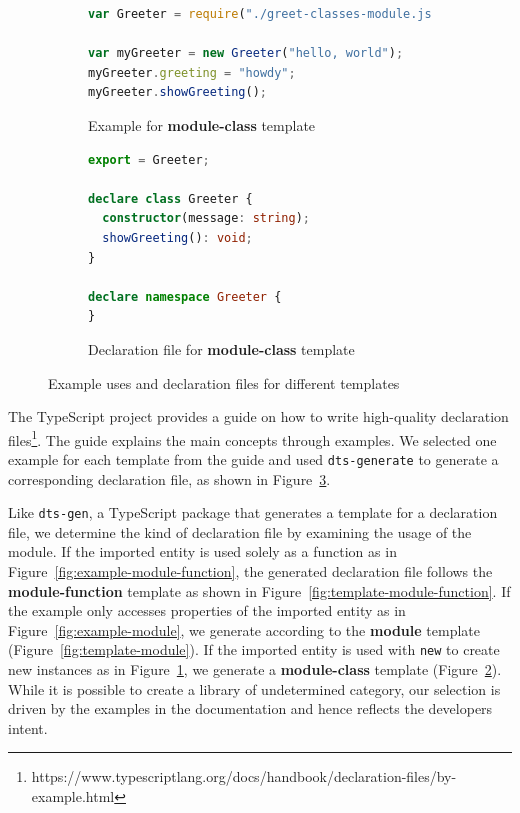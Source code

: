 \documentclass[english,cleveref,autoref,submission]{programming}
\newcommand{\figref}[1]{Figure~\ref{#1}}
\begin{document}
\begin{figure}[tp]
    \begin{subfigure}{0.48\linewidth}
      \begin{lstlisting}[language=JavaScript,numbers=none]
var Greeter = require("./greet-classes-module.js");

var myGreeter = new Greeter("hello, world");
myGreeter.greeting = "howdy";
myGreeter.showGreeting();
      \end{lstlisting}
      \caption{Example for \textbf{module-class} template}
      \label{fig:example-class}
    \end{subfigure}
    \hfill
    \begin{subfigure}{0.48\linewidth}
      \begin{lstlisting}[language=TypeScript,numbers=none]
export = Greeter;

declare class Greeter {
  constructor(message: string);
  showGreeting(): void;
}

declare namespace Greeter {
}
      \end{lstlisting}
      \caption{Declaration file for \textbf{module-class} template}
      \label{fig:template-class}
    \end{subfigure}

  \caption{Example uses and declaration files for different templates}
  \label{fig:typescript-templates-by-example}
\end{figure}
 
The TypeScript project provides a guide on how to write high-quality declaration
files\footnote{https://www.typescriptlang.org/docs/handbook/declaration-files/by-example.html}. The guide
explains the main concepts through examples. We selected one example for each template
from the guide and
used \texttt{dts-generate} to generate a corresponding declaration file, as shown in
\figref{fig:typescript-templates-by-example}.

Like \texttt{dts-gen}, a TypeScript package that generates a template for a declaration
file, we determine the kind of declaration file by examining the usage
of the module. If the
imported entity is used solely as a function as in Figure~\ref{fig:example-module-function}, the
generated declaration file follows the \textbf{module-function} template as shown in Figure~\ref{fig:template-module-function}.
If the example only accesses properties of the imported entity as in
Figure~\ref{fig:example-module}, we generate according to the \textbf{module} template (Figure~\ref{fig:template-module}).
If the imported entity is used with \lstinline/new/ to create new instances as in
Figure~\ref{fig:example-class}, we generate a \textbf{module-class} template (Figure~\ref{fig:template-class}).
While it is possible to create a library of undetermined category, our selection is driven
by the examples in the documentation and 
hence reflects the developers intent.
\end{document}
